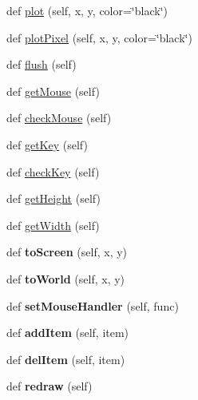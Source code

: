 \begin{DoxyCompactItemize}
\item 
def \hyperlink{classgraphics_1_1_graph_win_ac93adafee6ea1c0d9bb32b64cfbe754c}{plot} (self, x, y, color=\char`\"{}black\char`\"{})
\item 
def \hyperlink{classgraphics_1_1_graph_win_a66ef7f9b272d4ef482f834855ccfa0c4}{plot\+Pixel} (self, x, y, color=\char`\"{}black\char`\"{})
\item 
def \hyperlink{classgraphics_1_1_graph_win_a232137e7f2464c4ed6fa4a6fd5022196}{flush} (self)
\item 
def \hyperlink{classgraphics_1_1_graph_win_a4fdf1cf728e9aa559f2912592f66c23e}{get\+Mouse} (self)
\item 
def \hyperlink{classgraphics_1_1_graph_win_a47a21f43176302d35e418810c88235ea}{check\+Mouse} (self)
\item 
def \hyperlink{classgraphics_1_1_graph_win_adf821f120ef3baf805a4945b009b4903}{get\+Key} (self)
\item 
def \hyperlink{classgraphics_1_1_graph_win_a84c703d3a1521fc5edb4fd8af462ebd1}{check\+Key} (self)
\item 
def \hyperlink{classgraphics_1_1_graph_win_a100d08973109234fa8b17ccc0ac3ff89}{get\+Height} (self)
\item 
def \hyperlink{classgraphics_1_1_graph_win_a5bad6bf8b35250baf4f4b45993f85162}{get\+Width} (self)
\item 
def {\bfseries to\+Screen} (self, x, y)\hypertarget{classgraphics_1_1_graph_win_a4dfd70dc27ff32544c0eee0e73f52c36}{}\label{classgraphics_1_1_graph_win_a4dfd70dc27ff32544c0eee0e73f52c36}

\item 
def {\bfseries to\+World} (self, x, y)\hypertarget{classgraphics_1_1_graph_win_a6c40e111bf739598f2128c95977caff7}{}\label{classgraphics_1_1_graph_win_a6c40e111bf739598f2128c95977caff7}

\item 
def {\bfseries set\+Mouse\+Handler} (self, func)\hypertarget{classgraphics_1_1_graph_win_a6b0162764403abcbb64d3de5a8e21c1c}{}\label{classgraphics_1_1_graph_win_a6b0162764403abcbb64d3de5a8e21c1c}

\item 
def {\bfseries add\+Item} (self, item)\hypertarget{classgraphics_1_1_graph_win_acb38179ff82c99fe11e5150e2fbbf1e4}{}\label{classgraphics_1_1_graph_win_acb38179ff82c99fe11e5150e2fbbf1e4}

\item 
def {\bfseries del\+Item} (self, item)\hypertarget{classgraphics_1_1_graph_win_a617ee0e44a58c66c06df5d4d51edbee5}{}\label{classgraphics_1_1_graph_win_a617ee0e44a58c66c06df5d4d51edbee5}

\item 
def {\bfseries redraw} (self)\hypertarget{classgraphics_1_1_graph_win_afd181d963aa18c8f8215c114d6124b72}{}\label{classgraphics_1_1_graph_win_afd181d963aa18c8f8215c114d6124b72}

\end{DoxyCompactItemize}
